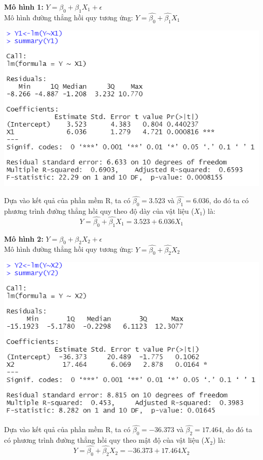 \documentclass[a4paper]{article}
\theoremstyle{nonumberplain}
\begin{document}
\textbf{Mô hình 1:} $Y= \beta_0 + \beta_1 X_1 + \epsilon$\\
Mô hình đường thẳng hồi quy tương ứng: $Y= \hat{\beta_0} + \hat{\beta_1} X_1$
\begin{center}
\includegraphics[scale =0.9]{bai2_1i.PNG} 
\end{center}
Dựa vào kết quả của phần mềm R, ta có $\hat{\beta_0} = 3.523$ và $\hat{\beta_1} = 6.036$, do đó ta có phương trình đường thẳng hồi quy theo độ dày của vật liệu ($X_1$) là:
$$Y =   \hat{\beta_0} + \hat{\beta_1} X_1 = 3.523 + 6.036 X_1$$

\textbf{Mô hình 2:} $Y= \beta_0 + \beta_2 X_2 + \epsilon$\\
Mô hình đường thẳng hồi quy tương ứng: $Y= \hat{\beta_0} + \hat{\beta_2} X_2$
\begin{center}
\includegraphics[scale =0.9]{bai2_1ii.PNG} 
\end{center}
Dựa vào kết quả của phần mềm R, ta có $\hat{\beta_0} = -36.373$ và $\hat{\beta_2} = 17.464$, do đó ta có phương trình đường thẳng hồi quy theo mật độ của vật liệu ($X_2$) là:
$$Y =   \hat{\beta_0} + \hat{\beta_2} X_2 = -36.373 + 17.464 X_2$$
\end{document}
